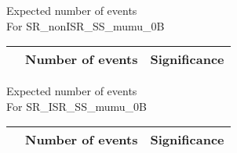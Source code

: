 \begin{frame}{Expected number of events \\ For SR\_nonISR\_SS\_mumu\_0B}
\vspace{5mm}
\begin{tabular}{|c|c|c|}
\hline
& Number of events & Significance \\
\hline

\end{tabular}
\end{frame}

\begin{frame}{Expected number of events \\ For SR\_ISR\_SS\_mumu\_0B}
\vspace{5mm}
\begin{tabular}{|c|c|c|}
\hline
& Number of events & Significance \\
\hline

\end{tabular}
\end{frame}

